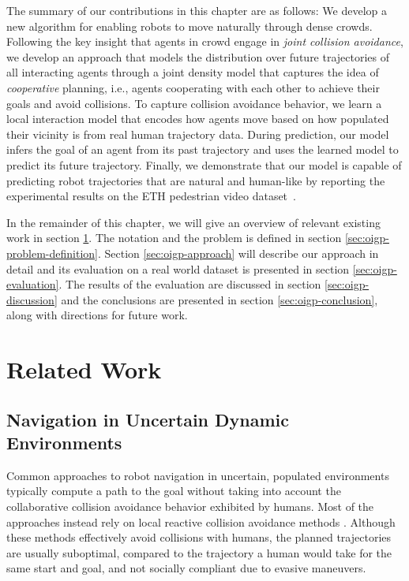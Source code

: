 The summary of our contributions in this chapter are as follows: We
develop a new algorithm for enabling robots to move naturally through
dense crowds.
Following the key insight that agents in crowd engage in \textit{joint
  collision avoidance}, we develop an approach that models the
distribution over future trajectories of all interacting agents
through a joint density model that captures the idea of
\textit{cooperative} planning, i.e., agents cooperating with each
other to achieve their goals and avoid collisions.  To capture
collision avoidance behavior, we learn a local interaction model that
encodes how agents move based on how populated their vicinity is from
real human trajectory data.  During prediction, our model infers the
goal of an agent from its past trajectory and uses the learned model
to predict its future trajectory.  Finally, we demonstrate that our
model is capable of predicting robot trajectories that are natural and
human-like by reporting the experimental results on the ETH pedestrian
video dataset~\cite{pellegrini09}.

In the remainder of this chapter, we will give an overview of relevant
existing work in section \ref{sec:oigp-related-work}. The notation and the
problem is defined in section \ref{sec:oigp-problem-definition}. Section
\ref{sec:oigp-approach} will describe our approach in detail and its
evaluation on a real world dataset is presented in section
\ref{sec:oigp-evaluation}. The results of the evaluation are discussed in
section \ref{sec:oigp-discussion} and the conclusions are presented in
section \ref{sec:oigp-conclusion}, along with directions for future work.

\section{Related Work}
\label{sec:oigp-related-work}

\subsection{Navigation in Uncertain Dynamic Environments}
\label{sec:oigp-navig-dynam-envir}
Common approaches to robot navigation in uncertain, populated environments typically compute a path to the goal without taking into account the collaborative collision avoidance behavior exhibited by humans. Most of the approaches instead rely on local reactive collision avoidance methods \cite{philippsen2003smooth, thrun99}. Although these methods effectively avoid collisions with humans, the planned trajectories are usually suboptimal, compared to the trajectory a human would take for the same start and goal, and not socially compliant due to evasive maneuvers.

